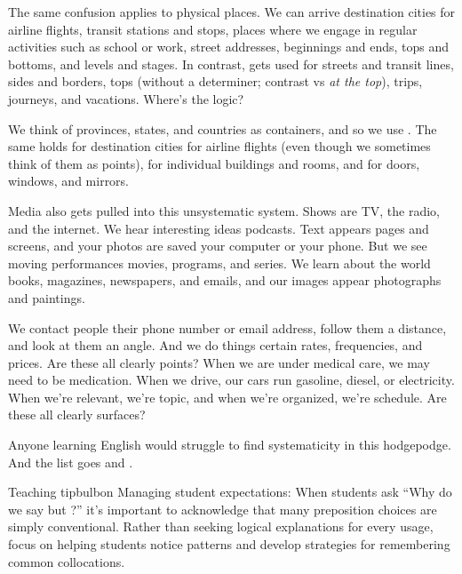 The same confusion applies to physical places. We can arrive  destination
cities for airline flights, transit stations and stops, places where we engage in
regular activities such as school or work, street addresses, beginnings and ends,
tops and bottoms, and levels and stages. In contrast,  gets used for streets and
transit lines, sides and borders, tops (without a determiner; contrast  vs \textit{at
the top}), trips, journeys, and vacations. Where's the logic?

We think of provinces, states, and countries as containers, and so we use .
The same holds for destination cities for airline flights (even though we sometimes think of them as points), for individual buildings and rooms, and for doors,
windows, and mirrors.

Media also gets pulled into this unsystematic system. Shows are  TV, 
the radio, and  the internet. We hear interesting ideas  podcasts. Text appears
 pages and screens, and your photos are saved  your computer or your phone.
But we see moving performances  movies, programs, and series. We learn about
the world  books, magazines, newspapers, and emails, and our images appear 
photographs and paintings.

We contact people  their phone number or email address, follow them  a
distance, and look at them  an angle. And we do things  certain rates, frequencies, and prices. Are these all clearly points? When we are under medical
care, we may need to be  medication. When we drive, our cars run  gasoline, diesel, or electricity. When we're relevant, we're  topic, and when we're
organized, we're  schedule. Are these all clearly surfaces? 

Anyone learning English would struggle to find systematicity in this hodgepodge. And the list goes  and .

\begin{tblsfilledsymbol}{Teaching tip}{bulbon}
Managing student expectations: When students ask \enquote{Why do we say  but ?} it's important to acknowledge that many preposition choices are simply conventional. Rather than seeking logical explanations for every usage, focus on helping students notice patterns and develop strategies for remembering common collocations.
\end{tblsfilledsymbol}


